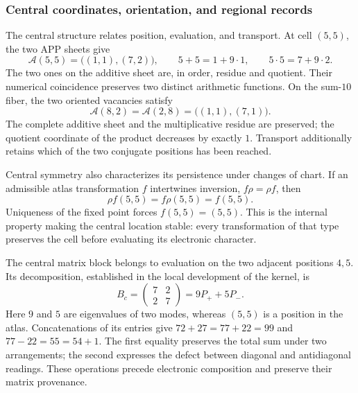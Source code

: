\subsubsection{Central coordinates, orientation, and regional records}
\label{el-centro:registros}

The central structure relates position, evaluation, and transport. At
cell \((5,5)\), the two APP sheets give
\begin{equation}
 \mathcal A(5,5)=\bigl((1,1),(7,2)\bigr),\qquad
 5+5=1+9\cdot1,\qquad5\cdot5=7+9\cdot2.
 \label{el-centro:app}
\end{equation}
The two ones on the additive sheet are, in order, residue and quotient.
Their numerical coincidence preserves two distinct arithmetic functions.
On the sum-\(10\) fiber, the two oriented vacancies satisfy
\begin{equation}
 \mathcal A(8,2)=\mathcal A(2,8)=\bigl((1,1),(7,1)\bigr).
 \label{el-centro:vacancias}
\end{equation}
The complete additive sheet and the multiplicative residue are preserved;
the quotient coordinate of the product decreases by exactly
\(1\). Transport additionally retains which of the two conjugate
positions has been reached.



Central symmetry also characterizes its persistence under changes of
chart. If an admissible atlas transformation \(f\) intertwines
inversion, \(f\rho=\rho f\), then
\[
 \rho f(5,5)=f\rho(5,5)=f(5,5).
\]
Uniqueness of the fixed point forces \(f(5,5)=(5,5)\). This is the
internal property making the central location stable: every
transformation of that type preserves the cell before evaluating its
electronic character.

The central matrix block belongs to evaluation on the two
adjacent positions \(4,5\). Its decomposition, established in the
local development of the kernel, is
\[
 B_c=\begin{pmatrix}7&2\\2&7\end{pmatrix}=9P_++5P_-.
\]
Here \(9\) and \(5\) are eigenvalues of two modes, whereas
\((5,5)\) is a position in the atlas. Concatenations of its
entries give \(72+27=77+22=99\) and
\(77-22=55=54+1\). The first equality preserves the total sum under
two arrangements; the second expresses the defect between diagonal
and antidiagonal readings. These operations precede electronic
composition and preserve their matrix provenance.

